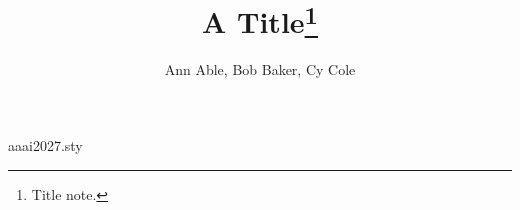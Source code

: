 \begin{filecontents*}[overwrite]{aaai2027.sty}
\def\maketitle{\par\begingroup\def\thefootnote{\fnsymbol{footnote}}\twocolumn[\@maketitle]\@thanks\endgroup
  \setcounter{footnote}{0}\let\maketitle\relax\let\@maketitle\relax
  \gdef\@thanks{}\gdef\@author{}\gdef\@title{}\let\thanks\relax}
\def\@maketitle{\newcounter{aaai@eqfn}\setcounter{aaai@eqfn}{0}%
  \newcounter{aaai@corrfn}\setcounter{aaai@corrfn}{0}\newif\ifaaai@corrmulti\aaai@corrmultifalse
  \newsavebox{\titlearea}%
  \sbox{\titlearea}{\let\footnote\relax\let\thanks\relax\setcounter{footnote}{0}%
    \def\equalcontrib{\ifnum\value{aaai@eqfn}=0 \footnote{These authors contributed equally.}%
      \setcounter{aaai@eqfn}{\value{footnote}}\else\footnotemark[\value{aaai@eqfn}]\fi}%
    \def\corresponding{\ifnum\value{aaai@corrfn}=0 \footnote{Corresponding author.}%
      \setcounter{aaai@corrfn}{\value{footnote}}\else\footnotemark[\value{aaai@corrfn}]\global\aaai@corrmultitrue\fi}%
    \vbox{\hsize\textwidth\centering{\LARGE\bf\@title\par}\vskip 1em{\Large\bf\@author\par}}}%
  \vbox{\let\footnote\thanks\relax\setcounter{footnote}{0}%
    \def\equalcontrib{\ifnum\value{aaai@eqfn}=0 \footnote{These authors contributed equally.}%
      \setcounter{aaai@eqfn}{\value{footnote}}\else\footnotemark[\value{aaai@eqfn}]\fi}%
    \def\corresponding{\ifnum\value{aaai@corrfn}=0 \footnote{Corresponding author\ifaaai@corrmulti{s}\fi.}%
      \setcounter{aaai@corrfn}{\value{footnote}}\else\footnotemark[\value{aaai@corrfn}]\fi}%
    \hsize\textwidth\centering{\LARGE\bf\@title\par}\vskip 1em{\Large\bf\@author\par}}}
\end{filecontents*}
\documentclass{article}
\usepackage{aaai2027}
\title{A Title\thanks{Title note.}}
\author{Ann Able\equalcontrib\corresponding, Bob Baker\equalcontrib, Cy Cole\corresponding}

\maketitle
Body.

